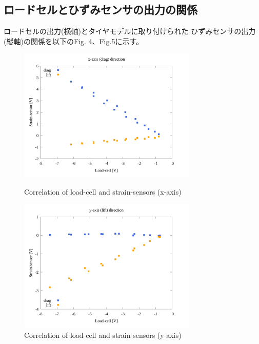\documentclass[twocolumn,a4j]{jsarticle}
\begin{document}
\subsection{ロードセルとひずみセンサの出力の関係}
ロードセルの出力(横軸)とタイヤモデルに取り付けられた
ひずみセンサの出力(縦軸)の関係を以下のFig. 4、Fig.5に示す。
\begin{figure}[htbp]
    \footnotesize
    \begin{center}
        \includegraphics[width=85mm]{../images/05_strainsensor-loadcell_x.png}
        \caption{Correlation of load-cell and strain-sensors (x-axis)}
        \includegraphics[width=85mm]{../images/06_strainsensor-loadcell_y.png}
        \caption{Correlation of load-cell and strain-sensors (y-axis)}
    \end{center}
\end{figure}
\end{document}
